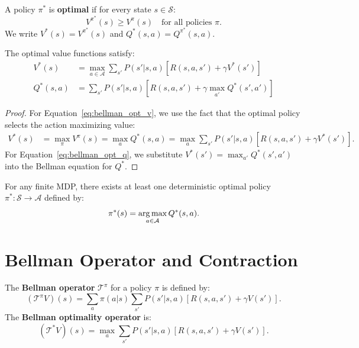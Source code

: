 \begin{definition}
A policy $\pi^*$ is \textbf{optimal} if for every state $s \in \mathcal{S}$:
\[
    V^{\pi^*}(s) \geq V^\pi(s) \quad \text{for all policies } \pi.
\]
We write $V^*(s) = V^{\pi^*}(s)$ and $Q^*(s,a) = Q^{\pi^*}(s,a)$.
\end{definition}

\begin{theorem}
The optimal value functions satisfy:
\begin{align}
    V^*(s) &= \max_{a \in \mathcal{A}} \sum_{s'} P(s'|s,a)
    \left[ R(s,a,s') + \gamma V^*(s') \right] \label{eq:bellman_opt_v} \\
    Q^*(s,a) &= \sum_{s'} P(s'|s,a)
    \left[ R(s,a,s') + \gamma \max_{a'} Q^*(s',a') \right] \label{eq:bellman_opt_q}
\end{align}
\end{theorem}

\begin{proof}
For Equation~\eqref{eq:bellman_opt_v}, we use the fact that the optimal policy
selects the action maximizing value:
\begin{align*}
    V^*(s) &= \max_\pi V^\pi(s) = \max_a Q^*(s,a)
    = \max_a \sum_{s'} P(s'|s,a)[R(s,a,s') + \gamma V^*(s')].
\end{align*}
For Equation~\eqref{eq:bellman_opt_q}, we substitute $V^*(s') = \max_{a'} Q^*(s',a')$
into the Bellman equation for $Q^*$.
\end{proof}

\begin{theorem}
\label{thm:existence_opt}
For any finite MDP, there exists at least one deterministic optimal policy
$\pi^* : \mathcal{S} \to \mathcal{A}$ defined by:
\[
    \pi^*(s) = \operatorname*{arg\,max}_{a \in \mathcal{A}} Q^*(s, a).
\]
\end{theorem}

\section{Bellman Operator and Contraction}

\begin{definition}
The \textbf{Bellman operator} $\mathcal{T}^\pi$ for a policy $\pi$ is defined by:
\[
    (\mathcal{T}^\pi V)(s) = \sum_a \pi(a|s) \sum_{s'} P(s'|s,a)
    [R(s,a,s') + \gamma V(s')].
\]
The \textbf{Bellman optimality operator} is:
\[
    (\mathcal{T}^* V)(s) = \max_a \sum_{s'} P(s'|s,a)
    [R(s,a,s') + \gamma V(s')].
\]
\end{definition}


